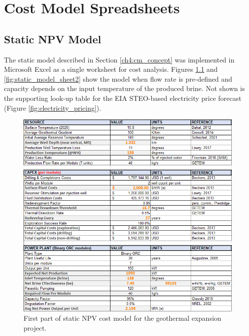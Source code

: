 \chapter{Cost Model Spreadsheets}\label{app:B_cost_model_spreadsheets}

\section{Static NPV Model}\label{app:B_static_model}
The static model described in Section \ref{ch4:cm_concept} was implemented in Microsoft Excel as a single worksheet for cost analysis. Figures \ref{fig:static_model_sheet1} and \ref{fig:static_model_sheet2} show the model when flow rate is pre-defined and capacity depends on the input temperature of the produced brine. Not shown is the supporting look-up table for the EIA STEO-based electricity price forecast (Figure \ref{fig:electricity_pricing}).
\vfill
\pagebreak

\begin{figure}[H]
\centering
\includegraphics[width=\textwidth]{templates/images/Figure-Static_Model_SheetA.png}
\caption[Static cost model worksheet (part 1)]{First part of static NPV cost model for the geothermal expansion project.}
\label{fig:static_model_sheet1}
\end{figure}

